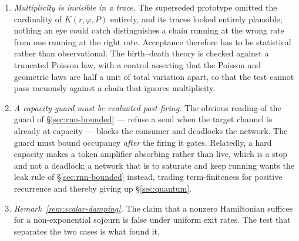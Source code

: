 \documentclass[11pt,a4paper]{article}
\theoremstyle{plain}
\theoremstyle{definition}
\theoremstyle{remark}
\begin{document}
\begin{enumerate}[leftmargin=2.2em]
\item \emph{Multiplicity is invisible in a trace.} The superseded prototype omitted the cardinality
of $K(r,\varphi,P)$ entirely, and its traces looked entirely plausible; nothing an eye could catch
distinguishes a chain running at the wrong rate from one running at the right rate. Acceptance
therefore has to be statistical rather than observational. The birth--death theory is checked against
a truncated Poisson law, with a control asserting that the Poisson and geometric laws are half a unit
of total variation apart, so that the test cannot pass vacuously against a chain that ignores
multiplicity.
\item \emph{A capacity guard must be evaluated post-firing.} The obvious reading of the guard of
\S\ref{sec:rnn-bounded} --- refuse a send when the target channel is already at capacity --- blocks
the consumer and deadlocks the network. The guard must bound occupancy \emph{after} the firing it
gates. Relatedly, a hard capacity makes a token amplifier absorbing rather than live, which is a stop
and not a deadlock; a network that is to saturate and keep running wants the leak rule of
\S\ref{sec:rnn-bounded} instead, trading term-finiteness for positive recurrence and thereby giving
up \S\ref{sec:quantum}.
\item \emph{Remark~\ref{rem:scalar-damping}.} The claim that a nonzero Hamiltonian suffices for a
non-exponential sojourn is false under uniform exit rates. The test that separates the two cases is
what found it.
\end{enumerate}
\end{document}
